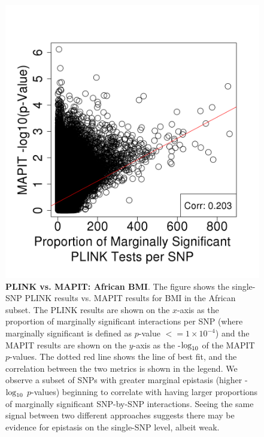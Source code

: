 \documentclass[12pt,a4paper]{article}
\def\log{{\rm log}}
\begin{document}
\begin{figure}[htb]
\centering
\includegraphics[scale=.45]{Images/Main/InterPath_Main_Figure_PLINKvsMAPIT_vs2_African_BMI.png}
\caption[TBD]{\textbf{PLINK vs. MAPIT: African BMI}. The figure shows the single-SNP PLINK results vs. MAPIT results for BMI in the African subset. The PLINK results are shown on the $x$-axis as the proportion of marginally significant interactions per SNP (where marginally significant is defined as $p$-value $<= 1\times10^{-4}$) and the MAPIT results are shown on the $y$-axis as the -$\log_{10}$ of the MAPIT $p$-values. The dotted red line shows the line of best fit, and the correlation between the two metrics is shown in the legend. We observe a subset of SNPs with greater marginal epistasis (higher -$\log_{10}$ $p$-values) beginning to correlate with having larger proportions of marginally significant SNP-by-SNP interactions. Seeing the same signal between two different approaches suggests there may be evidence for epistasis on the single-SNP level, albeit weak.}
\label{InterPath-Main-Figure-PLINKvsMAPIT-BMI-African}
\end{figure}
\end{document}
